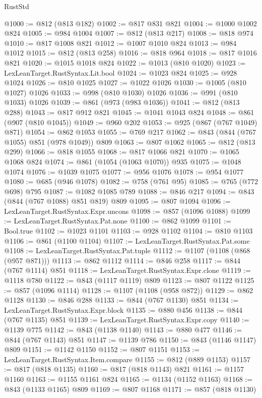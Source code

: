 \begin{lexlean}{RustStd}
\begin{coremodule}
@1000 := @812 (@813 @182)
@1002 := @817 @831 @821
@1004 := @1000 @1002 @824
@1005 := @984 @1004
@1007 := @812 (@813 @217)
@1008 := @818 @974
@1010 := @817 @1008 @821
@1012 := @1007 @1010 @824
@1013 := @984 @1012
@1015 := @812 (@813 @258)
@1016 := @818 @964
@1018 := @817 @1016 @821
@1020 := @1015 @1018 @824
@1022 := @1013 (@810 @1020)
@1023 := LexLeanTarget.RustSyntax.Lit.bool
@1024 := @1023 @824
@1025 := @928 @1024
@1026 := @810 @1025
@1027 := @1022 @1026
@1030 := @1005 (@810 @1027) @1026
@1033 := @998 (@810 @1030) @1026
@1036 := @991 (@810 @1033) @1026
@1039 := @861 (@973 (@983 @1036))
@1041 := @812 (@813 @288)
@1043 := @817 @912 @821
@1045 := @1041 @1043 @824
@1048 := @861 (@907 (@810 @1045))
@1049 := @960 @202
@1053 := @925 (@867 (@767 @1049) @871)
@1054 := @862 @1053
@1055 := @769 @217
@1062 := @843 (@844 (@767 @1055) @851 (@978 @1049)) @809
@1063 := @807 @1062
@1065 := @812 (@813 @299)
@1066 := @818 @1055
@1068 := @817 @1066 @821
@1070 := @1065 @1068 @824
@1074 := @861 (@1054 (@1063 @1070)) @935
@1075 := @1048 @1074
@1076 := @1039 @1075
@1077 := @956 @1076
@1078 := @954 @1077
@1080 := @685 (@946 @1078)
@1082 := @758 (@761 @95)
@1085 := @765 (@772 @698) @795
@1087 := @1082 @1085 @789
@1088 := @846 @217
@1094 := @843 (@844 (@767 @1088) @851 @819) @809
@1095 := @807 @1094
@1096 := LexLeanTarget.RustSyntax.Expr.uncons
@1098 := @857 (@1096 @1088)
@1099 := LexLeanTarget.RustSyntax.Pat.none
@1100 := @862 @1099
@1101 := Bool.true
@1102 := @1023 @1101
@1103 := @928 @1102
@1104 := @810 @1103
@1106 := @861 (@1100 @1104)
@1107 := LexLeanTarget.RustSyntax.Pat.some
@1108 := LexLeanTarget.RustSyntax.Pat.tuple
@1112 := @1107 (@1108 (@868 (@957 @871)))
@1113 := @862 @1112
@1114 := @846 @258
@1117 := @844 (@767 @1114) @851
@1118 := LexLeanTarget.RustSyntax.Expr.clone
@1119 := @1118 @780
@1122 := @843 (@1117 @1119) @809
@1123 := @807 @1122
@1125 := @857 (@1096 @1114)
@1128 := @1107 (@1108 (@958 @872))
@1129 := @862 @1128
@1130 := @846 @288
@1133 := @844 (@767 @1130) @851
@1134 := LexLeanTarget.RustSyntax.Expr.block
@1135 := @880 @456
@1138 := @844 (@767 @1135) @851
@1139 := LexLeanTarget.RustSyntax.Expr.copy
@1140 := @1139 @775
@1142 := @843 (@1138 @1140)
@1143 := @880 @477
@1146 := @844 (@767 @1143) @851
@1147 := @1139 @786
@1150 := @843 (@1146 @1147) @809
@1151 := @1142 @1150
@1152 := @807 @1151
@1153 := LexLeanTarget.RustSyntax.Item.compare
@1155 := @812 (@889 @1153)
@1157 := @817 (@818 @1135)
@1160 := @817 (@818 @1143) @821
@1161 := @1157 @1160
@1163 := @1155 @1161 @824
@1165 := @1134 (@1152 @1163)
@1168 := @843 (@1133 @1165) @809
@1169 := @807 @1168
@1171 := @857 (@818 @1130)

\end{coremodule}
\end{lexlean}
